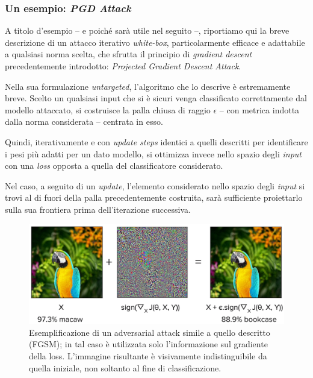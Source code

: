 \documentclass[a4paper, twoside]{article}
\begin{document}
\subsubsection{Un esempio: \textit{PGD Attack}}

A titolo d'esempio -- e poiché sarà utile nel seguito --, riportiamo qui la breve descrizione di un attacco iterativo \textit{white-box}, particolarmente efficace e adattabile a qualsiasi norma scelta, che sfrutta il principio di \textit{gradient descent} precedentemente introdotto: \textit{Projected Gradient Descent Attack}.

Nella sua formulazione \textit{untargeted}, l'algoritmo che lo descrive è estremamente breve. Scelto un qualsiasi input che si è sicuri venga classificato correttamente dal modello attaccato, si costruisce la palla chiusa di raggio $\epsilon$ -- con metrica indotta dalla norma considerata -- centrata in esso.

Quindi, iterativamente e con \textit{update steps} identici a quelli descritti per identificare i pesi più adatti per un dato modello, si ottimizza invece nello spazio degli \textit{input} con una \textit{loss} opposta a quella del classificatore considerato.

Nel caso, a seguito di un \textit{update}, l'elemento considerato nello spazio degli \textit{input} si trovi al di fuori della palla precedentemente costruita, sarà sufficiente proiettarlo sulla sua frontiera prima dell'iterazione successiva.

\begin{figure}[H]
	\centering
	\includegraphics[scale=0.4]{fgsm-macaw-bookcase.png}
	\captionsetup{labelformat=empty}
	\caption{Esemplificazione di un adversarial attack simile a quello descritto (FGSM); in tal caso è utilizzata solo l'informazione sul gradiente della loss. L'immagine risultante è visivamente indistinguibile da quella iniziale, non soltanto al fine di classificazione. }
\end{figure}
\end{document}

